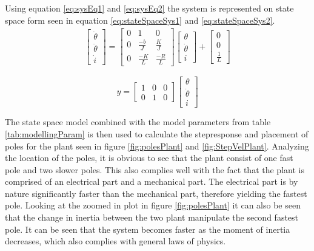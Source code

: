 \documentclass[../../main.tex]{subfiles}
\begin{document}
Using equation \ref{eq:sysEq1} and \ref{eq:sysEq2} the system is represented on state space form seen in equation \ref{eq:stateSpaceSys1} and \ref{eq:stateSpaceSys2}.
\begin{align}
\begin{bmatrix}
\dot{\theta}\\
\ddot{\theta}\\
\dot{i}
\end{bmatrix} =
\begin{bmatrix}
0 & 1 & 0 \\
0 & \frac{-b}{J} & \frac{K}{J}\\
0 & \frac{-K}{L} & \frac{-R}{L}
\end{bmatrix}
\begin{bmatrix}
\theta\\
\dot{\theta}\\
i
\end{bmatrix}
+ 
\begin{bmatrix}
0 \\
0 \\
\frac{1}{L}
\end{bmatrix} 
\label{eq:stateSpaceSys1}
\end{align}

\begin{equation}
    y = 
    \begin{bmatrix}
    1 & 0 & 0\\
    0 & 1 & 0
    \end{bmatrix}
    \begin{bmatrix}
    \theta\\
    \dot{\theta}\\
    i
    \end{bmatrix}
    \label{eq:stateSpaceSys2}
\end{equation}

The state space model combined with the model parameters from table \ref{tab:modellingParam} is then used to calculate the stepresponse and placement of poles for the plant seen in figure \ref{fig:polesPlant} and \ref{fig:StepVelPlant}. Analyzing the location of the poles, it is obvious to see that the plant consist of one fast pole and two slower poles. This also complies well with the fact that the plant is comprised of an electrical part and a mechanical part. The electrical part is by nature significantly faster than the mechanical part, therefore yielding the fastest pole. Looking at the zoomed in plot in figure \ref{fig:polesPlant} it can also be seen that the change in inertia between the two plant manipulate the second fastest pole. It can be seen that the system becomes faster as the moment of inertia decreases, which also complies with general laws of physics. 
\end{document}
